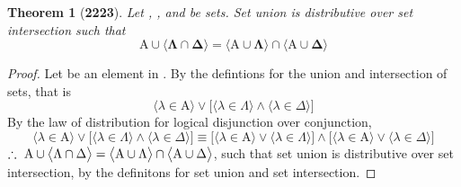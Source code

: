 \documentclass[preview]{standalone}
\newtheorem{theorem}{Theorem}
\begin{document}
\begin{theorem}[\textbf{2223}]
    Let , \bm{$\Lambda$}, and \bm{$\Delta$} be sets.
    Set union is distributive over set intersection such that
    \begin{equation*}
        \bm{
            \mathrm{A} \cup \Big \langle \Lambda \cap \Delta \Big \rangle 
                =
            \Big \langle \mathrm{A} \cup \Lambda \Big \rangle
                \cap 
            \Big \langle \mathrm{A} \cup \Delta \Big \rangle
        }
    \end{equation*}
\end{theorem}
\begin{proof}
    Let \bm{$\lambda$} be an element in 
    .
    By the defintions for the union and intersection of sets, that is 
    \begin{equation*}
        \big \langle \lambda \in \mathrm{A} \big \rangle
            \lor
        \Big[
            \big \langle \lambda \in \Lambda \big \rangle
                \land
            \big \langle \lambda \in \Delta \big \rangle
        \Big]
    \end{equation*}
    By the law of distribution for logical disjunction over conjunction,
    \begin{equation*}
        \big \langle \lambda \in \mathrm{A} \big \rangle
            \lor
        \Big[
            \big \langle \lambda \in \Lambda \big \rangle
                \land
            \big \langle \lambda \in \Delta \big \rangle
        \Big] 
            \equiv
        \Big[
            \big \langle \lambda \in \mathrm{A} \big \rangle
                \lor
            \big \langle \lambda \in \Lambda \big \rangle
        \Big]
            \land
        \Big[
            \big \langle \lambda \in \mathrm{A} \big \rangle
                \lor
            \big \langle \lambda \in \Delta \big \rangle
        \Big]
    \end{equation*}
    $\therefore \text{\space} \relax{
    \mathrm{A} \cup \big \langle \Lambda \cap \Delta \big \rangle 
        = 
    \big \langle \mathrm{A} \cup \Lambda \big \rangle
        \cap 
    \big \langle \mathrm{A} \cup \Delta \big \rangle
    }$, 
    such that set union is distributive over set intersection,
    by the definitons for set union and set intersection.
\end{proof}
\end{document}
